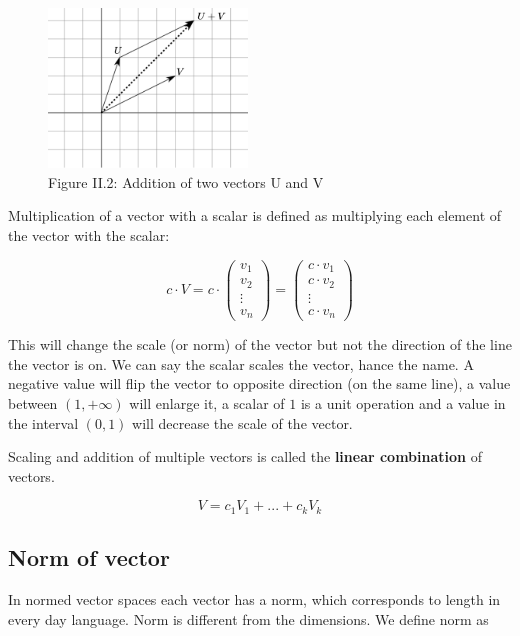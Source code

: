 \begin{figure}[htbp]
    \begin{center}
        \includegraphics[width=150pt]{../img/ii-addition.png}
        \caption{Figure II.2: Addition of two vectors U and V}
    \end{center}
\end{figure}


Multiplication of a vector with a scalar is defined as multiplying each element of the vector with the scalar:

\[c \cdot V = c \cdot \begin{pmatrix} v_1 \\ v_2 \\ \vdots \\ v_n \end{pmatrix} = \begin{pmatrix} c \cdot v_1 \\ c \cdot v_2 \\ \vdots \\ c \cdot  v_n \end{pmatrix}\]

This will change the scale (or norm) of the vector but not the direction of the line the vector is on. We can say the scalar scales the vector, hance the name. A negative value will flip the vector to opposite direction (on the same line), a value between \((1, +\infty)\) will enlarge it, a scalar of \(1\) is a unit operation and a value in the interval \((0, 1)\) will decrease the scale of the vector.

Scaling and addition of multiple vectors is called the \textbf{linear combination} of vectors.

\[V = c_1 V_1 + ... + c_k V_k\]

\subsection{Norm of vector}

In normed vector spaces each vector has a norm, which corresponds to length in every day language. Norm is different from the dimensions. We define norm as

